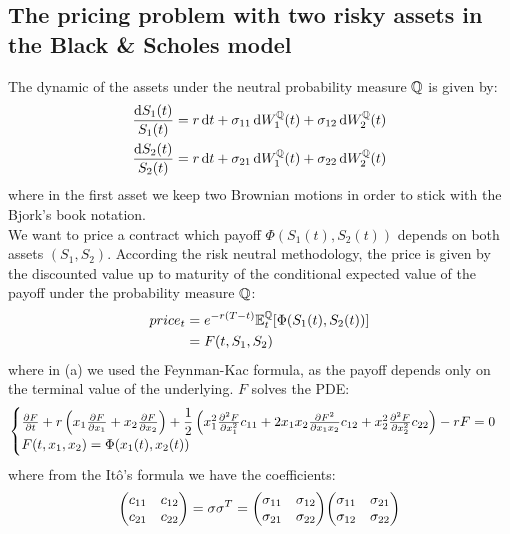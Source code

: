 \subsection[Pricing]{The pricing problem with two risky assets in the Black \& Scholes model}
The dynamic of the assets under the neutral probability measure $\mathbb{Q}$ is given by:
\begin{align}
    \dfrac{\dd S_1(t)}{S_1(t)} &= r\,\dd t + \sigma_{11}\,\dd W_1^{\mathbb{Q}}(t) + \sigma_{12}\,\dd W_2^{\mathbb{Q}}(t) \\
    \dfrac{\dd S_2(t)}{S_2(t)} &= r\,\dd t + \sigma_{21}\,\dd W_1^{\mathbb{Q}}(t) + \sigma_{22}\,\dd W_2^{\mathbb{Q}}(t)
\end{align}
where in the first asset we keep two Brownian motions in order to stick with the Bjork's book notation. \\
We want to price a contract which payoff $\Phi(S_1(t),S_2(t))$ depends on both assets $(S_1,S_2)$. According the risk neutral methodology, the price is given by the discounted value up to maturity of the conditional expected value of the payoff under the probability measure $\mathbb{Q}$:
\begin{align}
    price_t &= e^{-r(T-t)}\mathbb{E}^{\mathbb{Q}}_t[\Phi(S_1(t),S_2(t))] \\
    &= 
    F(t,S_1,S_2)
\end{align}
where in (a) we used the Feynman-Kac formula, as the payoff depends only on the terminal value of the underlying. $F$ solves the PDE: %
\begin{equation}\label{bspdee}
    \begin{cases}
    \pdv{F}{t} + r\left(x_1\pdv{F}{x_1} + x_2\pdv{F}{x_2}\right) + \dfrac{1}{2}\left(x_1^2\pdv[2]{F}{x_1}c_{11} + 2x_1x_2\pdv{F^2}{x_1x_2}c_{12} + x_2^2\pdv[2]{F}{x_2}c_{22}\right) - rF = 0 \\
    F(t,x_1,x_2) = \Phi(x_1(t),x_2(t))
    \end{cases}
\end{equation}
where from the Itô's formula we have the coefficients:
\begin{equation}
    \mqty(c_{11}&c_{12}\\c_{21}&c_{22}) = \sigma\sigma^T = \mqty(\sigma_{11}&\sigma_{12}\\\sigma_{21}&\sigma_{22})\mqty(\sigma_{11}&\sigma_{21}\\\sigma_{12}&\sigma_{22})
\end{equation}
